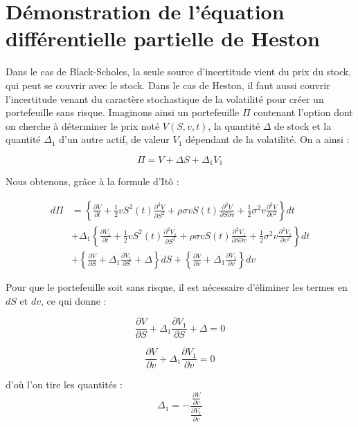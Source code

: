 \section{Démonstration de l'équation différentielle partielle de Heston}
\label{app:heston edp}

Dans le cas de Black-Scholes, la seule source d’incertitude vient du prix du stock, qui peut se couvrir avec le stock. Dans le cas de Heston, il faut aussi couvrir l’incertitude venant du caractère stochastique de la volatilité pour créer un portefeuille sans risque. Imaginons ainsi un portefeuille \( \Pi \) contenant l’option dont on cherche à déterminer le prix noté \( V(S, v, t) \), la quantité \( \Delta \) de stock et la quantité \( \Delta_1 \) d’un autre actif, de valeur \( V_1 \) dépendant de la volatilité. On a ainsi :

\[
\Pi = V + \Delta S + \Delta_1 V_1
\]

Nous obtenons, grâce à la formule d’Itô :

\begin{equation} \label{heston ito edp}
\begin{split}
d\Pi & = \left\{ \frac{\partial V}{\partial t} + \frac{1}{2} v S^2(t) \frac{\partial^2 V}{\partial S^2} + \rho \sigma v S(t) \frac{\partial^2 V}{\partial S \partial v} + \frac{1}{2} \sigma^2 v \frac{\partial^2 V}{\partial v^2} \right\} dt \\
 & + \Delta_1 \left\{ \frac{\partial V_1}{\partial t} + \frac{1}{2} v S^2(t) \frac{\partial^2 V_1}{\partial S^2} + \rho \sigma v S(t) \frac{\partial^2 V_1}{\partial S \partial v} + \frac{1}{2} \sigma^2 v \frac{\partial^2 V_1}{\partial v^2} \right\} dt\\
 & + \left\{ \frac{\partial V}{\partial S} + \Delta_1 \frac{\partial V_1}{\partial S} + \Delta \right\} dS + \left\{ \frac{\partial V}{\partial v} +\Delta_1 \frac{\partial V_1}{\partial v} \right\} dv
\end{split}
\end{equation}


Pour que le portefeuille soit sans risque, il est nécessaire d’éliminer les termes en \( dS \) et \( dv \), ce qui donne :

\[
 \frac{\partial V}{\partial S} + \Delta_1 \frac{\partial V_1}{\partial S} + \Delta  = 0
\]

\[
\frac{\partial V}{\partial v} + \Delta_1 \frac{\partial V_1}{\partial v} = 0
\]

d’où l’on tire les quantités :
\[
\Delta_1 = -\frac{\frac{\partial V}{\partial v}}{\frac{\partial V_1}{\partial v}}
\]

